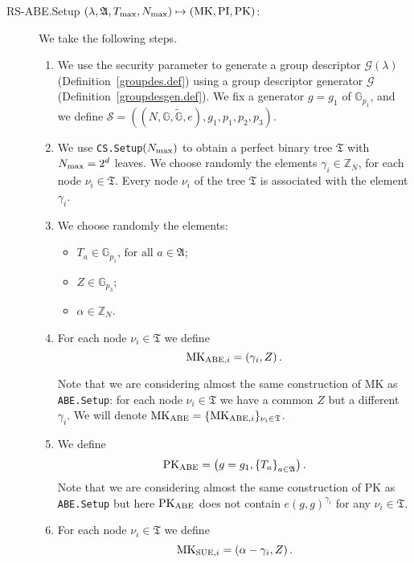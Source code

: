 \documentclass[a4paper,10pt]{article}
\newcommand{\G}{\mathbb{G}}
\newcommand{\GT}{\widetilde{\G}} \newcommand{\N}{\mathbb{N}}
\newcommand{\Z}{\mathbb{Z}}
\newcommand{\tree}{\mathfrak{T}}
\newcommand{\maps}[2]{$ \left( #1 \right) \mapsto \left( #2 \right) $}
\newcommand{\algorithm}[2]{\texttt{#1.#2}}
\newcommand{\algorithmdef}[4]{\item[#1.#2 \maps{#3}{#4}:]}
\newcommand{\randomchoose}[1]{We choose randomly the element\ifstrequal{#1}{s}{}{s} }
\begin{document}
	\begin{description}
	\algorithmdef{RS-ABE}{Setup}{\lambda,\mathfrak{A},T_{\textnormal{max}},N_{\textnormal{max}}}{\mathit{\mathrm{MK}},\mathit{\mathrm{PI}},\mathit{\mathrm{PK}}} 


	We take the following steps.
	\begin{enumerate}
		\item
		We use the security parameter to generate a group descriptor $\mathscr{G}(\lambda)$ (De\-finition~\ref{groupdes.def}) using a group descriptor generator $\mathscr{G}$ (Definition~\ref{groupdesgen.def}). We fix a generator $g=g_1$ of $\G_{p_1}$, and we define $\mathscr{S}=\left((N, \G, \GT, e), g_1,p_1,\allowbreak{}p_2,\allowbreak{}p_3\right)$.
		\item
		We use \algorithm{CS}{Setup}$(N_{\textnormal{max}})$ to obtain a perfect binary tree $\tree$ with $N_{\textnormal{max}}=2^d$ leaves.
		\randomchoose{p}$\gamma_{i}\in \Z_N$, for each node $\nu_i\in \tree$.
		Every node $\nu_i$ of the tree $\tree$ is associated with the element $\gamma_{i}$.
		\item
		We choose randomly the elements:
		\begin{itemize}
\item $T_a\in \G_{p_1}\text{, for all }a\in \mathfrak{A}$;
		\item $Z\in\G_{p_3}$;
		\item $\alpha\in \Z_N$.
	\end{itemize}
		
		\item
		For each node $\nu_i\in\tree$ we define 
	\[
		\mathrm{MK}_{\textnormal{ABE},i}=\left( \gamma_i, Z \right). 
	\]
	
	Note that we are considering almost the same construction of $\mathrm{MK}$ as \algorithm{ABE}{Setup}:  for each node $\nu_i\in\tree$ we have a common $Z$ but a different $\gamma_i$. We will denote $\mathrm{MK}_{\textnormal{ABE}}=\{\mathrm{MK}_{\textnormal{ABE},i}\}_{\nu_i\in\tree}$.
	\item
	We define
	\[
		\mathrm{PK}_{\textnormal{ABE}}=\left( g=g_1, \left\{T_a\right\}_{a\in \mathfrak{A}}\right).
	\]
Note that we are considering almost the same construction of $\mathrm{PK}$ as \algorithm{ABE}{Setup} but here   $\mathrm{PK}_{\textnormal{ABE}}$ does not contain $e(g,g)^{\gamma_i}$ for any $\nu_i\in\tree$.
\item
For each node $\nu_i\in\tree$ we define
	\[
		\mathrm{MK}_{\textnormal{SUE},i}=\left( \alpha-\gamma_i, Z \right).
	\]
	

\end{enumerate}
\end{description}
\end{document}
